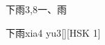 \begin{entry}{下雨}{3,8}{⼀、⾬}
  \begin{phonetics}{下雨}{xia4 yu3}[][HSK 1]
  \end{phonetics}
\end{entry}
